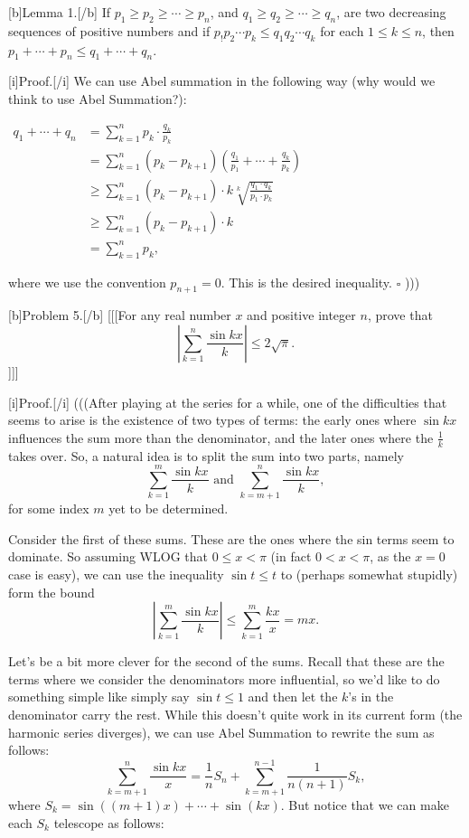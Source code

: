 [b]Lemma 1.[/b] If $p_1 \geq p_2 \geq \cdots \geq p_n$, and $q_1 \geq q_2 \geq \cdots \geq q_n$, are two decreasing sequences of positive numbers and if $p_! p_2 \cdots p_k \leq q_1 q_2 \cdots q_k$ for each $1 \leq k \leq n$, then $p_1 + \cdots + p_n \leq q_1 + \cdots + q_n$.  


[i]Proof.[/i] We can use Abel summation in the following way (why would we think to use Abel Summation?):  

$\begin{align*}
q_1 + \cdots + q_n
&= \sum_{k=1}^n p_k \cdot \frac{q_k}{p_k} \\
&= \sum_{k=1}^n (p_k - p_{k+1}) \left( \frac{q_1}{p_1} + \cdots + \frac{q_k}{p_k} \right) \\
&\geq \sum_{k=1}^n (p_k - p_{k+1}) \cdot k \sqrt[k]{\frac{q_1 \cdot q_k}{p_1 \cdot p_k}} \\
&\geq \sum_{k=1}^n (p_k - p_{k+1}) \cdot k \\
&= \sum_{k=1}^n p_k, 
\end{align*}$  

where we use the convention $p_{n+1} = 0$. This is the desired inequality. $\square$  )))

[b]Problem 5.[/b] [[[For any real number $x$ and positive integer $n$, prove that  
\[ \left | \sum_{k=1}^n \frac{\sin kx}{k} \right | \leq 2 \sqrt{\pi}. \] ]]]

[i]Proof.[/i] (((After playing at the series for a while, one of the difficulties that seems to arise is the existence of two types of terms: the early ones where $\sin kx$ influences the sum more than the denominator, and the later ones where the $\frac{1}{k}$ takes over. So, a natural idea is to split the sum into two parts, namely  
\[ \sum_{k=1}^m \frac{\sin kx}{k} \text{ and } \sum_{k=m+1}^n \frac{\sin kx}{k}, \]  
for some index $m$ yet to be determined.  

Consider the first of these sums. These are the ones where the sin terms seem to dominate. So assuming WLOG that $0 \leq x < \pi$ (in fact $0 < x < \pi$, as the $x=0$ case is easy), we can use the inequality $\sin t \leq t$ to (perhaps somewhat stupidly) form the bound  
\[  \left | \sum_{k=1}^m \frac{\sin kx}{k} \right | \leq \sum_{k=1}^m \frac{kx}{x} = mx. \]  

Let’s be a bit more clever for the second of the sums. Recall that these are the terms where we consider the denominators more influential, so we’d like to do something simple like simply say $\sin t \leq 1$ and then let the $k$'s in the denominator carry the rest. While this doesn’t quite work in its current form (the harmonic series diverges), we can use Abel Summation to rewrite the sum as follows: 
\[ \sum_{k=m+1}^n \frac{\sin kx}{x} = \frac{1}{n} S_n + \sum_{k=m+1}^{n-1} \frac{1}{n(n+1)} S_k, \tag{5} \]  
where $S_k = \sin((m+1)x) + \cdots + \sin(kx)$. But notice that we can make each $S_k$ telescope as follows: 

